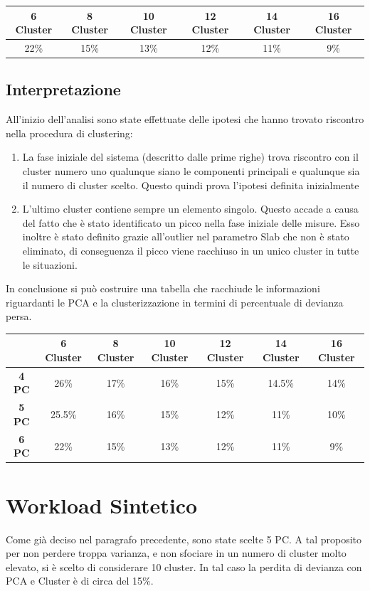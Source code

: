  
 \begin{center}
 	\begin{tabular}{|c|c|c|c|c|c|}
 		\hline
 		\textbf{6 Cluster} & \textbf{8 Cluster} & \textbf{10 Cluster} &\textbf{12 Cluster}& \textbf{14 Cluster} & \textbf{16 Cluster} \\
 		\hline
 		22\% & 15\%& 13\% & 12\% & 11\% & 9\% \\
 		\hline
 	\end{tabular}
 \end{center}

\subsection{Interpretazione}
All'inizio dell'analisi sono state effettuate delle ipotesi che hanno trovato riscontro nella procedura di clustering:
\begin{enumerate}
	\item La fase iniziale del sistema (descritto dalle prime righe) trova riscontro con il cluster numero uno qualunque siano le componenti principali e qualunque sia il numero di cluster scelto. Questo quindi prova l'ipotesi definita inizialmente
	\item L'ultimo cluster contiene sempre un elemento singolo. Questo accade a causa del fatto che è stato identificato un picco nella fase iniziale delle misure. Esso inoltre è stato definito grazie all'outlier nel parametro Slab che non è stato eliminato, di conseguenza il picco viene racchiuso in un unico cluster in tutte le situazioni.
\end{enumerate}
\vspace{0.5cm}
In conclusione si può costruire una tabella che racchiude le informazioni riguardanti le PCA e la clusterizzazione in termini di percentuale di devianza persa.
 \begin{center}
	\begin{tabular}{|c|c|c|c|c|c|c|}
		\hline
		& \textbf{6 Cluster} & \textbf{8 Cluster} & \textbf{10 Cluster} &\textbf{12 Cluster}& \textbf{14 Cluster} & \textbf{16 Cluster} \\
		\hline
		\textbf{4 PC} & 26\%& 17\% & 16\% & 15\% & 14.5\% & 14\% \\

	\textbf{5 PC} & 25.5\%& 16\% & 15\% & 12\% & 11\% & 10\% \\

		\textbf{6 PC} & 22\% & 15\%& 13\% & 12\% & 11\% & 9\% \\
		\hline
	\end{tabular}
\end{center}

\section{Workload Sintetico}
Come già deciso nel paragrafo precedente, sono state scelte 5 PC. A tal proposito per non perdere troppa varianza, e non sfociare in un numero di cluster molto elevato, si è scelto di considerare 10 cluster. In tal caso la perdita di devianza con PCA e Cluster è di circa del 15\%.